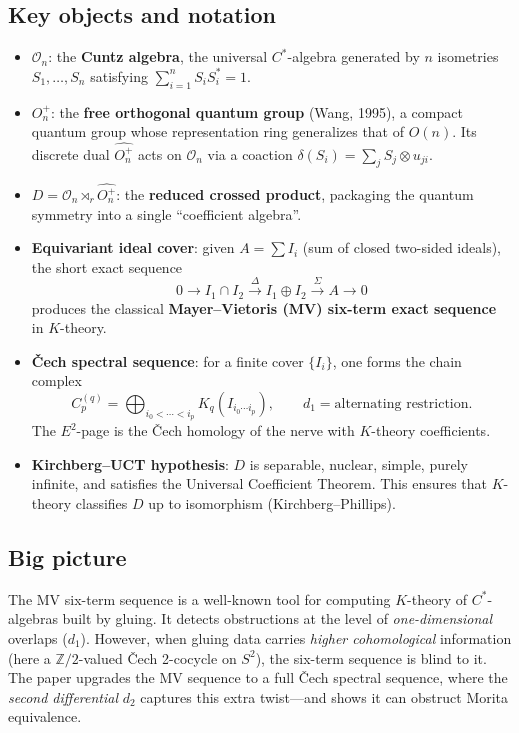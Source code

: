 \documentclass[11pt,a4paper]{article}
\theoremstyle{plain}
\theoremstyle{definition}
\theoremstyle{remark}
\begin{document}
\subsection*{Key objects and notation}
\begin{itemize}[nosep]
  \item $\mathcal{O}_n$: the \textbf{Cuntz algebra}, the universal $C^*$-algebra generated by $n$ isometries $S_1, \ldots, S_n$ satisfying $\sum_{i=1}^n S_i S_i^* = 1$.
  \item $O_n^+$: the \textbf{free orthogonal quantum group} (Wang, 1995), a compact quantum group whose representation ring generalizes that of $O(n)$.  Its discrete dual $\widehat{O_n^+}$ acts on $\mathcal{O}_n$ via a coaction $\delta(S_i) = \sum_j S_j \otimes u_{ji}$.
  \item $D = \mathcal{O}_n \rtimes_r \widehat{O_n^+}$: the \textbf{reduced crossed product}, packaging the quantum symmetry into a single ``coefficient algebra''.
  \item \textbf{Equivariant ideal cover}: given $A = \sum I_i$ (sum of closed two-sided ideals), the short exact sequence
    \[
      0 \to I_1 \cap I_2 \xrightarrow{\Delta} I_1 \oplus I_2 \xrightarrow{\Sigma} A \to 0
    \]
    produces the classical \textbf{Mayer--Vietoris (MV) six-term exact sequence} in $K$-theory.
  \item \textbf{\v{C}ech spectral sequence}: for a finite cover $\{I_i\}$, one forms the chain complex
    \[
      C^{(q)}_p = \bigoplus_{i_0 < \cdots < i_p} K_q(I_{i_0 \cdots i_p}), \qquad d_1 = \text{alternating restriction}.
    \]
    The $E^2$-page is the \v{C}ech homology of the nerve with $K$-theory coefficients.
  \item \textbf{Kirchberg--UCT hypothesis}: $D$ is separable, nuclear, simple, purely infinite, and satisfies the Universal Coefficient Theorem.  This ensures that $K$-theory classifies $D$ up to isomorphism (Kirchberg--Phillips).
\end{itemize}

\subsection*{Big picture}
The MV six-term sequence is a well-known tool for computing $K$-theory of $C^*$-algebras built by gluing.  It detects obstructions at the level of \emph{one-dimensional} overlaps ($d_1$).
However, when gluing data carries \emph{higher cohomological} information (here a $\mathbb{Z}/2$-valued \v{C}ech 2-cocycle on $S^2$), the six-term sequence is blind to it.
The paper upgrades the MV sequence to a full \v{C}ech spectral sequence, where the \emph{second differential} $d_2$ captures this extra twist---and shows it can obstruct Morita equivalence.
\end{document}
